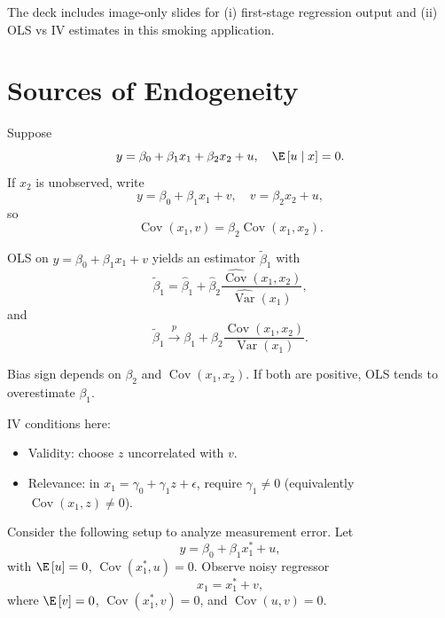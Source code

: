 \begin{remark}
	The deck includes image-only slides for (i) first-stage regression output and (ii) OLS vs IV estimates in this smoking application.
\end{remark}

\section{Sources of Endogeneity}

\begin{remark}
	Suppose \[
		y = \beta_0 + \beta_1 x_1 + \beta_2 x_2 + u, \quad \E\left[u \mid x\right]=0
	.\]
	If $x_2$ is unobserved, write \[
		y = \beta_0 + \beta_1 x_1 + v, \quad v=\beta_2 x_2 + u
	,\]
	so \[
		\operatorname{Cov}(x_1,v)=\beta_2\operatorname{Cov}(x_1,x_2)
	.\]
\end{remark}

\begin{proposition}
	OLS on $y=\beta_0+\beta_1 x_1+v$ yields an estimator $\tilde{\beta}_1$ with \[
		\tilde{\beta}_1 = \hat{\beta}_1 + \hat{\beta}_2\frac{\widehat{\operatorname{Cov}}(x_1,x_2)}{\widehat{\operatorname{Var}}(x_1)}
	,\]
	and \[
		\tilde{\beta}_1 \xrightarrow{p} \beta_1 + \beta_2\frac{\operatorname{Cov}(x_1,x_2)}{\operatorname{Var}(x_1)}
	.\]
\end{proposition}

\begin{remark}
	Bias sign depends on $\beta_2$ and $\operatorname{Cov}(x_1,x_2)$. If both are positive, OLS tends to overestimate $\beta_1$.

	IV conditions here:
	\begin{itemize}
		\item Validity: choose $z$ uncorrelated with $v$.
		\item Relevance: in $x_1 = \gamma_0 + \gamma_1 z + \epsilon$, require $\gamma_1\ne 0$ (equivalently $\operatorname{Cov}(x_1,z)\ne 0$).
	\end{itemize}
\end{remark}

Consider the following setup to analyze measurement error.
	Let \[
		y = \beta_0 + \beta_1 x_1^* + u
	,\]
	with $\E\left[u\right]=0$, $\operatorname{Cov}(x_1^*,u)=0$. Observe noisy regressor \[
		x_1 = x_1^* + v
	,\]
	where $\E\left[v\right]=0$, $\operatorname{Cov}(x_1^*,v)=0$, and $\operatorname{Cov}(u,v)=0$.

